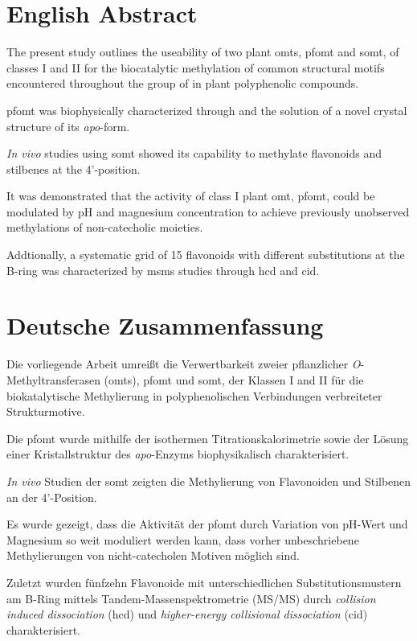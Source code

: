 \documentclass[10pt,a4paper]{article}
\newcommand{\pfomt}{\gls{pfomt}\xspace}
\newcommand{\somt}{\gls{somt}\xspace}
\begin{document}
 \section*{English Abstract} 

The present study outlines the useability of two plant \glspl{omt}, \pfomt and \somt, of classes I and II for the biocatalytic methylation of common structural motifs encountered throughout the group of in plant polyphenolic compounds.

\pfomt was biophysically characterized through  and the solution of a novel crystal structure of its \textit{apo}-form.

 
  \textit{In vivo} studies using \somt showed its capability to methylate flavonoids and stilbenes at the 4'-position. 
 
  It was demonstrated that the activity of class I plant \gls{omt}, \pfomt, could be modulated by pH and magnesium concentration to achieve previously unobserved methylations of non-catecholic moieties. 
 
  Addtionally, a systematic grid of 15 flavonoids with different substitutions at the B-ring was characterized by \gls{msms} studies through \gls{hcd} and \gls{cid}.

\clearpage

\section*{Deutsche Zusammenfassung}

 Die vorliegende Arbeit umreißt die Verwertbarkeit zweier pflanzlicher \textit{O}-Methyl\-trans\-fer\-asen (\glspl{omt}), \pfomt und \somt, der Klassen I and II für die biokatalytische Methylierung in polyphenolischen Verbindungen verbreiteter Strukturmotive. 
 
 Die \pfomt wurde mithilfe der isothermen Titrationskalorimetrie sowie der Lösung einer Kristallstruktur des \textit{apo}-Enzyms biophysikalisch charakterisiert. 
 
 \textit{In vivo} Studien der \somt zeigten die Methylierung von Flavonoiden und Stilbenen an der 4'-Position. 
 
  Es wurde gezeigt, dass die Aktivität der \pfomt durch Variation von pH-Wert und Magnesium so weit moduliert werden kann, dass vorher unbeschriebene Methylierungen von nicht-catecholen Motiven möglich sind. 
 
 Zuletzt wurden fünfzehn Flavonoide mit unterschiedlichen Substitutionsmustern am B-Ring mittels Tandem-Massen\-spek\-tro\-metrie (MS/MS) durch \textit{collision induced dissociation} (\gls{hcd}) und \textit{higher-energy collisional dissociation} (\gls{cid}) charakterisiert.   
\end{document}
